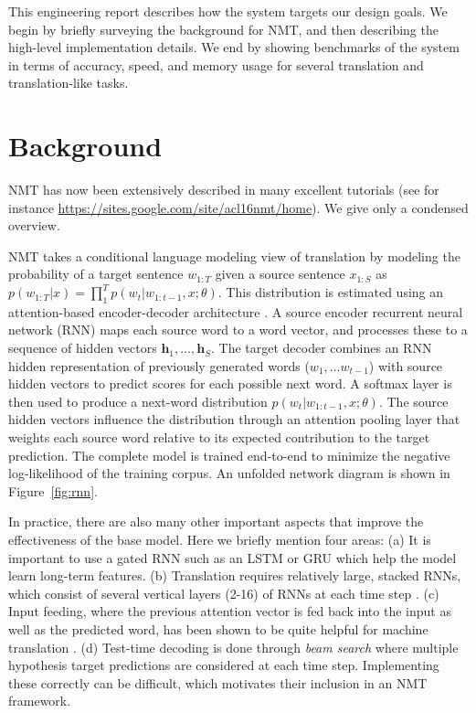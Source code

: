\documentclass[]{article}
\begin{document}
This engineering report describes how the system targets our design goals. We begin by briefly surveying the background for NMT, and then
describing the high-level implementation details.  We end by showing
benchmarks of the system in terms of accuracy, speed, and memory usage
for several translation and translation-like tasks.

\section{Background}

NMT has now been extensively described in many
excellent tutorials (see for instance
\url{https://sites.google.com/site/acl16nmt/home}). We give only
a condensed overview. 

NMT takes a conditional language modeling view of translation by modeling the
probability of a target sentence $w_{1:T}$ given a source sentence
$x_{1:S}$ as
$p(w_{1:T}| x) = \prod_{1}^T p(w_t| w_{1:t-1}, x; \theta)$. This
distribution is estimated using an attention-based encoder-decoder
architecture \citep{Bahdanau2015}. A source encoder recurrent neural
network (RNN) maps each source word to a word vector, and processes
these to a sequence of hidden vectors
$\mathbf{h}_1, \ldots, \mathbf{h}_S$.  The target decoder combines an
RNN hidden representation of previously generated words
($w_1, ... w_{t-1}$) with source hidden vectors to predict scores for
each possible next word. A softmax layer is then used to produce a
next-word distribution $ p(w_t| w_{1:t-1}, x; \theta)$. The source
hidden vectors influence the distribution through an attention pooling
layer that weights each source word relative to its expected
contribution to the target prediction. The complete model is trained
end-to-end to minimize the negative log-likelihood of the training
corpus. An unfolded network diagram is shown in Figure~\ref{fig:rnn}.


In practice, there are also many other important aspects that improve
the effectiveness of the base model. Here we briefly mention four
areas: (a) It is important to use a gated RNN such as an LSTM
\citep{hochreiter1997long} or GRU \citep{chung2014empirical} which help
the model learn long-term features. (b) Translation requires
relatively large, stacked RNNs, which consist of several vertical
layers (2-16) of RNNs at each time step \citep{sutskever14sequence}. (c)
Input feeding, where the previous attention vector is fed back into
the input as well as the predicted word, has been shown to be quite
helpful for machine translation \citep{Luong2015}.  (d) Test-time
decoding is done through \textit{beam search} where multiple
hypothesis target predictions are considered at each time
step. Implementing these correctly can be difficult, which motivates
their inclusion in an NMT framework.
\end{document}
